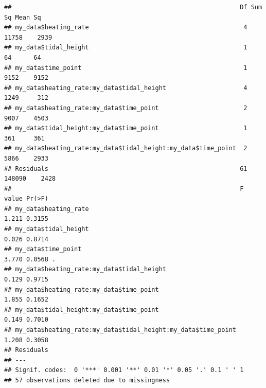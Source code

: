 \documentclass[
]{article}
\newenvironment{Shaded}{\begin{snugshade}}{\end{snugshade}}
\newcommand{\AttributeTok}[1]{\textcolor[rgb]{0.77,0.63,0.00}{#1}}
\newcommand{\FunctionTok}[1]{\textcolor[rgb]{0.00,0.00,0.00}{#1}}
\newcommand{\NormalTok}[1]{#1}
\newcommand{\OtherTok}[1]{\textcolor[rgb]{0.56,0.35,0.01}{#1}}
\newcommand{\SpecialCharTok}[1]{\textcolor[rgb]{0.00,0.00,0.00}{#1}}
\begin{document}
\begin{verbatim}
##                                                              Df Sum Sq Mean Sq
## my_data$heating_rate                                          4  11758    2939
## my_data$tidal_height                                          1     64      64
## my_data$time_point                                            1   9152    9152
## my_data$heating_rate:my_data$tidal_height                     4   1249     312
## my_data$heating_rate:my_data$time_point                       2   9007    4503
## my_data$tidal_height:my_data$time_point                       1    361     361
## my_data$heating_rate:my_data$tidal_height:my_data$time_point  2   5866    2933
## Residuals                                                    61 148090    2428
##                                                              F value Pr(>F)  
## my_data$heating_rate                                           1.211 0.3155  
## my_data$tidal_height                                           0.026 0.8714  
## my_data$time_point                                             3.770 0.0568 .
## my_data$heating_rate:my_data$tidal_height                      0.129 0.9715  
## my_data$heating_rate:my_data$time_point                        1.855 0.1652  
## my_data$tidal_height:my_data$time_point                        0.149 0.7010  
## my_data$heating_rate:my_data$tidal_height:my_data$time_point   1.208 0.3058  
## Residuals                                                                    
## ---
## Signif. codes:  0 '***' 0.001 '**' 0.01 '*' 0.05 '.' 0.1 ' ' 1
## 57 observations deleted due to missingness
\end{verbatim}

\begin{Shaded}
\end{Shaded}
\end{document}
